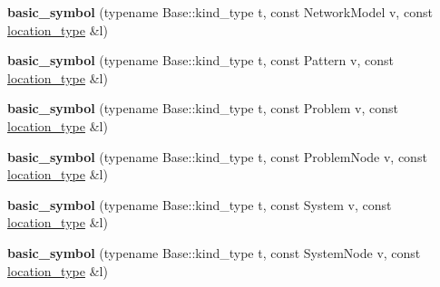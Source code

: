 \begin{DoxyCompactItemize}
\item 
{\bfseries basic\+\_\+symbol} (typename Base\+::kind\+\_\+type t, const Network\+Model v, const \hyperlink{classyy_1_1spec__parser_aeb5b1e66f65306eca737db5dfa61590d}{location\+\_\+type} \&l)\hypertarget{structyy_1_1spec__parser_1_1basic__symbol_a5444ad6551a570befad60b2eb9e34874}{}\label{structyy_1_1spec__parser_1_1basic__symbol_a5444ad6551a570befad60b2eb9e34874}

\item 
{\bfseries basic\+\_\+symbol} (typename Base\+::kind\+\_\+type t, const Pattern v, const \hyperlink{classyy_1_1spec__parser_aeb5b1e66f65306eca737db5dfa61590d}{location\+\_\+type} \&l)\hypertarget{structyy_1_1spec__parser_1_1basic__symbol_a7ef17b316f8172ca352621696ce244ed}{}\label{structyy_1_1spec__parser_1_1basic__symbol_a7ef17b316f8172ca352621696ce244ed}

\item 
{\bfseries basic\+\_\+symbol} (typename Base\+::kind\+\_\+type t, const Problem v, const \hyperlink{classyy_1_1spec__parser_aeb5b1e66f65306eca737db5dfa61590d}{location\+\_\+type} \&l)\hypertarget{structyy_1_1spec__parser_1_1basic__symbol_aba301dd6c0812553a9a2957f2c17daa6}{}\label{structyy_1_1spec__parser_1_1basic__symbol_aba301dd6c0812553a9a2957f2c17daa6}

\item 
{\bfseries basic\+\_\+symbol} (typename Base\+::kind\+\_\+type t, const Problem\+Node v, const \hyperlink{classyy_1_1spec__parser_aeb5b1e66f65306eca737db5dfa61590d}{location\+\_\+type} \&l)\hypertarget{structyy_1_1spec__parser_1_1basic__symbol_a77c4fe163b934fefc81fff0f62526412}{}\label{structyy_1_1spec__parser_1_1basic__symbol_a77c4fe163b934fefc81fff0f62526412}

\item 
{\bfseries basic\+\_\+symbol} (typename Base\+::kind\+\_\+type t, const System v, const \hyperlink{classyy_1_1spec__parser_aeb5b1e66f65306eca737db5dfa61590d}{location\+\_\+type} \&l)\hypertarget{structyy_1_1spec__parser_1_1basic__symbol_a952cc8ab2dd58d4ba60584d6b3dc072f}{}\label{structyy_1_1spec__parser_1_1basic__symbol_a952cc8ab2dd58d4ba60584d6b3dc072f}

\item 
{\bfseries basic\+\_\+symbol} (typename Base\+::kind\+\_\+type t, const System\+Node v, const \hyperlink{classyy_1_1spec__parser_aeb5b1e66f65306eca737db5dfa61590d}{location\+\_\+type} \&l)\hypertarget{structyy_1_1spec__parser_1_1basic__symbol_aee1ba6b3f9946bc46d0d60573579f203}{}\label{structyy_1_1spec__parser_1_1basic__symbol_aee1ba6b3f9946bc46d0d60573579f203}


\end{DoxyCompactItemize}
